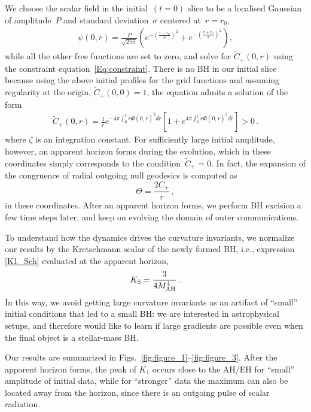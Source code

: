 \documentclass[floats,floatfix,showpacs,amssymb,prd,twocolumn,superscriptaddress,nofootinbib,nolongbibliography,reprint]{revtex4-2}
\newcommand{\be}{\begin{equation}}
\newcommand{\ee}{\end{equation}}
\def\be{\begin{equation}}
\def\ee{\end{equation}}
\begin{document}
We choose the scalar field in the initial~$(t=0)$ slice to be a localised Gaussian of amplitude~$P$ and standard deviation~$\sigma$ centered at~$r=r_0$, 
%
\begin{align}
    \psi(0,r)=\frac{P}{\sqrt{2\pi \sigma}} \left(e^{-\left(\frac{r-r_0}{\sigma}\right)^2} +e^{-\left(\frac{r+r_0}{\sigma}\right)^2} \right),
\end{align}
while all the other free functions are set to zero, and solve for $\tilde{C}_+(0,r)$ using the constraint equation~\eqref{Eq:constraint}. There is no BH in our initial slice because using the above initial profiles for the grid functions and assuming regularity at the origin, $\tilde{C}_+(0,0)=1$, the equation admits a solution of the form
\begin{align*}
    \tilde{C}_+(0,r)=\frac{1}{r} e^{-4\pi \int_0^r \tilde{r} \Phi(0,\tilde{r})^2 d\tilde{r}}\left[1+e^{4\pi\int_0^\zeta \tilde{r} \Phi(0,\tilde{r})^2 d\tilde{r}}\right]>0 \, .
\end{align*} 
where $\zeta$ is an integration constant.
 For sufficiently large initial amplitude, however, an apparent horizon forms during the evolution, which in these coordinates simply corresponds to the condition~$\tilde{C}_+ = 0$. In fact, the expansion of the congruence of radial outgoing null geodesics is computed as 
\begin{equation}
    \Theta=\frac{2C_+}{r}\,,
\end{equation} 
in these coordinates. After an apparent horizon forms, we perform BH excision a few time steps later, and keep on evolving the domain of outer communications.


To understand how the dynamics drives the curvature invariants, we normalize our results by the Kretschmann scalar of the newly formed BH, i.e., expression \eqref{K1_Sch} evaluated at the apparent horizon,
%
\be
K_{\text{S}}=\frac{3}{4M_{\rm AH}^4}\,.\label{eq:KS}
\ee
%
In this way, we avoid getting large curvature invariants as an artifact of ``small'' initial conditions that led to a small BH: we are interested in astrophysical setups, and therefore would like to learn if large gradients are possible even when the final object is a stellar-mass BH.







Our results are summarized in Figs.~\ref{fig:figure_1}--\ref{fig:figure_3}.
After the apparent horizon forms, the peak of $K_1$ occurs close to the AH/EH for ``small'' amplitude of initial data, while for ``stronger'' data the maximum can also be located away from the horizon, since there is an outgoing pulse of scalar radiation. 
\end{document}
